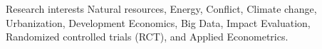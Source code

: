 \begin{rubric}{\small Research interests}
\entry*[ ]%
Natural resources, Energy, Conflict, Climate change, Urbanization, Development Economics, Big Data, Impact Evaluation, Randomized controlled trials (RCT), and Applied Econometrics.
\end{rubric}